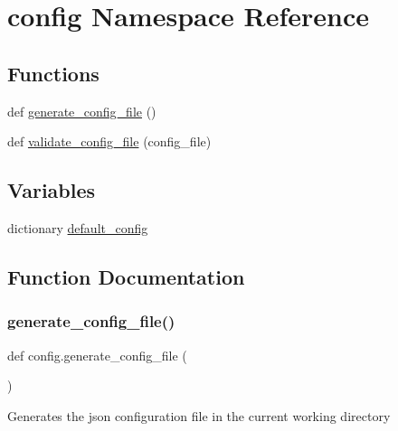 \hypertarget{namespaceconfig}{}\section{config Namespace Reference}
\label{namespaceconfig}
\subsection*{Functions}
\begin{DoxyCompactItemize}
\item 
def \hyperlink{namespaceconfig_a8e5e09166a67c11eb868143f4e85607f}{generate\+\_\+config\+\_\+file} ()
\item 
def \hyperlink{namespaceconfig_ab97d69eb9e4097d1e43e248b73676d6a}{validate\+\_\+config\+\_\+file} (config\+\_\+file)
\end{DoxyCompactItemize}
\subsection*{Variables}
\begin{DoxyCompactItemize}
\item 
dictionary \hyperlink{namespaceconfig_ac321195dcb6ced179a85db093e63a1c9}{default\+\_\+config}
\end{DoxyCompactItemize}


\subsection{Function Documentation}
\mbox{\label{namespaceconfig_a8e5e09166a67c11eb868143f4e85607f}} 
\subsubsection{\texorpdfstring{generate\+\_\+config\+\_\+file()}{generate\_config\_file()}}
{\footnotesize\ttfamily def config.\+generate\+\_\+config\+\_\+file (\begin{DoxyParamCaption}{ }\end{DoxyParamCaption})}

\begin{DoxyVerb}Generates the json configuration file in the current working directory \end{DoxyVerb}
 \mbox{\label{namespaceconfig_ab97d69eb9e4097d1e43e248b73676d6a}} 
